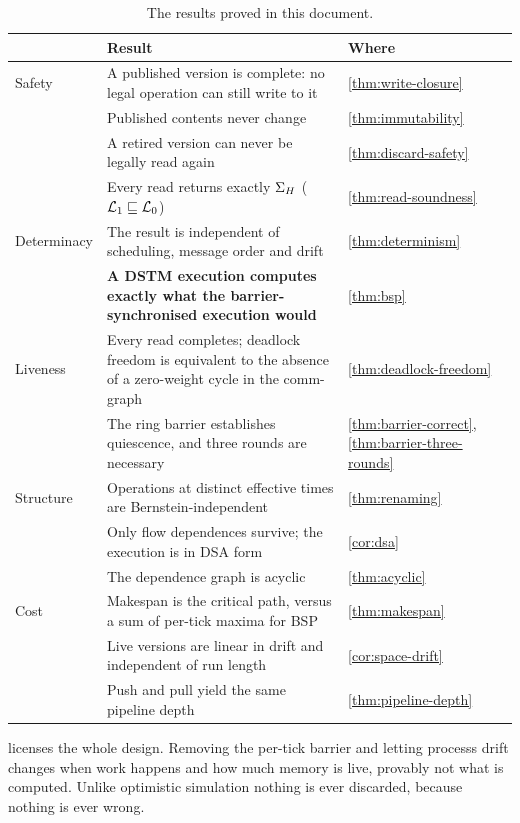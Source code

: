 \begin{table}[htbp]
\centering
\small
\begin{tabularx}{\textwidth}{@{}l >{\raggedright\arraybackslash}X l@{}}
\toprule
& \textbf{Result} & \textbf{Where} \\
\midrule
Safety & A published version is complete: no legal operation can still write
  to it & \cref{thm:write-closure} \\
       & Published contents never change & \cref{thm:immutability} \\
       & A retired version can never be legally read again
  & \cref{thm:discard-safety} \\
       & Every read returns exactly $\Sigma_{H}$ ($\mathcal{L}_1 \sqsubseteq \mathcal{L}_0$)
  & \cref{thm:read-soundness} \\
\midrule
Determinacy & The result is independent of scheduling, message order and drift
  & \cref{thm:determinism} \\
            & \textbf{A DSTM execution computes exactly what the
  barrier-synchronised execution would} & \cref{thm:bsp} \\
\midrule
Liveness & Every read completes; deadlock freedom is equivalent to the absence
  of a zero-weight cycle in the \gls{comm-graph} & \cref{thm:deadlock-freedom} \\
         & The ring barrier establishes quiescence, and three rounds are
  necessary & \cref{thm:barrier-correct}, \cref{thm:barrier-three-rounds} \\
\midrule
Structure & Operations at distinct effective times are Bernstein-independent
  & \cref{thm:renaming} \\
          & Only flow dependences survive; the execution is in DSA form
  & \cref{cor:dsa} \\
          & The dependence graph is acyclic & \cref{thm:acyclic} \\
\midrule
Cost & Makespan is the critical path, versus a sum of per-tick maxima for BSP
  & \cref{thm:makespan} \\
     & Live versions are linear in drift and independent of run length
  & \cref{cor:space-drift} \\
     & Push and pull yield the same pipeline depth
  & \cref{thm:pipeline-depth} \\
\bottomrule
\end{tabularx}
\caption{The results proved in this document.}
\label{tab:results}
\end{table}

 licenses the whole design. Removing the per-tick \gls{barrier}
and letting \glspl{process} \gls{drift} changes when work happens and how much
memory is live, provably not what is computed. Unlike optimistic simulation
nothing is ever discarded, because nothing is ever wrong.

